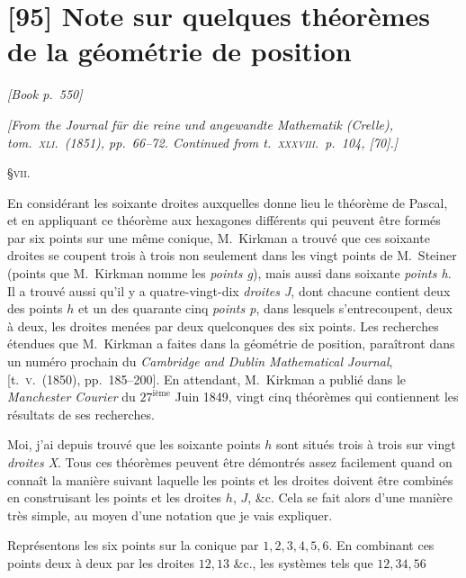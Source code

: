 \documentclass[11pt]{article}
\begin{document}
\section*{[95] Note sur quelques th\'eor\`emes de la g\'eom\'etrie de position}

\noindent\textit{[Book p.~550]}\hfill

\smallskip

\noindent\emph{[From the Journal f\"ur die reine und angewandte Mathematik (Crelle), tom.~\textsc{xli}.\ (1851), pp.~66--72. Continued from t.~\textsc{xxxviii}.\ p.~104, [70].]}

\medskip

\begin{center}\S\;\textsc{vii}.\end{center}

En consid\'erant les soixante droites auxquelles donne lieu le th\'eor\`eme de Pascal, et en appliquant ce th\'eor\`eme aux hexagones diff\'erents qui peuvent \^etre form\'es par six points sur une m\^eme conique, M.~Kirkman a trouv\'e que ces soixante droites se coupent trois \`a trois non seulement dans les vingt points de M.~Steiner (points que M.~Kirkman nomme les \emph{points g}), mais aussi dans soixante \emph{points h}. Il a trouv\'e aussi qu'il y a quatre-vingt-dix \emph{droites J}, dont chacune contient deux des points $h$ et un des quarante cinq \emph{points p}, dans lesquels s'entrecoupent, deux \`a deux, les droites men\'ees par deux quelconques des six points. Les recherches \'etendues que M.~Kirkman a faites dans la g\'eom\'etrie de position, para\^itront dans un num\'ero prochain du \emph{Cambridge and Dublin Mathematical Journal}, [t.~\textsc{v}.\ (1850), pp.~185--200]. En attendant, M.~Kirkman a publi\'e dans le \emph{Manchester Courier} du $27^{\text{i\`eme}}$ Juin 1849, vingt cinq th\'eor\`emes qui contiennent les r\'esultats de ses recherches.

Moi, j'ai depuis trouv\'e que les soixante points $h$ sont situ\'es trois \`a trois sur vingt \emph{droites X}. Tous ces th\'eor\`emes peuvent \^etre d\'emontr\'es assez facilement quand on conna\^it la mani\`ere suivant laquelle les points et les droites doivent \^etre combin\'es en construisant les points et les droites $h$, $J$, \&c. Cela se fait alors d'une mani\`ere tr\`es simple, au moyen d'une notation que je vais expliquer.

Repr\'esentons les six points sur la conique par $1, 2, 3, 4, 5, 6$. En combinant ces points deux \`a deux par les droites $12, 13$ \&c., les syst\`emes tels que $12, 34, 56$
\end{document}
